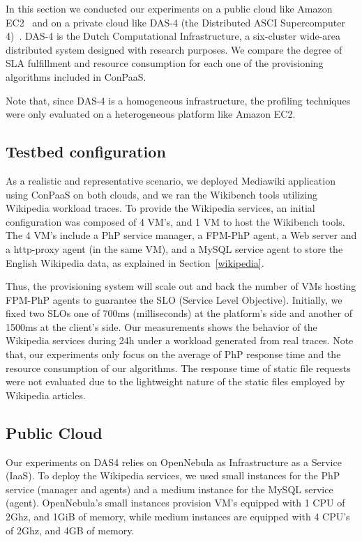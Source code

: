 In this section we conducted our experiments on a public cloud like Amazon EC2~\cite{amazonEC2} and on a private cloud like DAS-4 (the Distributed ASCI Supercomputer 4)~\cite{das4}. DAS-4 is the Dutch Computational Infrastructure, a six-cluster wide-area distributed system designed with research purposes.  We compare the degree of SLA fulfillment and resource consumption for each one of the provisioning algorithms included in ConPaaS.

Note that, since DAS-4 is a homogeneous infrastructure, the profiling techniques were only evaluated on a heterogeneous platform like Amazon EC2. 


\subsection{Testbed configuration}

As a realistic and representative scenario, we deployed Mediawiki application using ConPaaS on both clouds, and we ran the Wikibench tools utilizing Wikipedia workload traces.  To provide the Wikipedia services, an initial configuration was composed of 4 VM's, and 1 VM to host the Wikibench tools. The 4 VM's include a PhP service manager, a FPM-PhP agent, a Web server and a http-proxy agent (in the same VM), and a MySQL service agent to store the English Wikipedia data, as explained in Section~\ref{wikipedia}.

Thus, the provisioning system will scale out and back the number of VMs hosting FPM-PhP agents to guarantee the SLO (Service Level Objective). Initially, we fixed two SLOs one of 700ms (milliseconds) at the platform's side and another of 1500ms at the client's side. Our measurements shows the behavior of the Wikipedia services during 24h under a workload generated from real traces. Note that, our experiments only focus on the average of PhP response time and the resource consumption of our algorithms. The response time of static file requests were not evaluated due to the lightweight nature of the static files employed by Wikipedia articles. 

\subsection{Public Cloud}

Our experiments on DAS4 relies on OpenNebula as Infrastructure as a Service (IaaS). To deploy the Wikipedia services, we used small instances for the PhP service (manager and agents) and a medium instance for the MySQL service (agent). OpenNebula's small instances provision VM's equipped with 1 CPU of 2Ghz, and 1GiB of memory, while medium instances are equipped with 4 CPU's of 2Ghz, and 4GB of memory.

